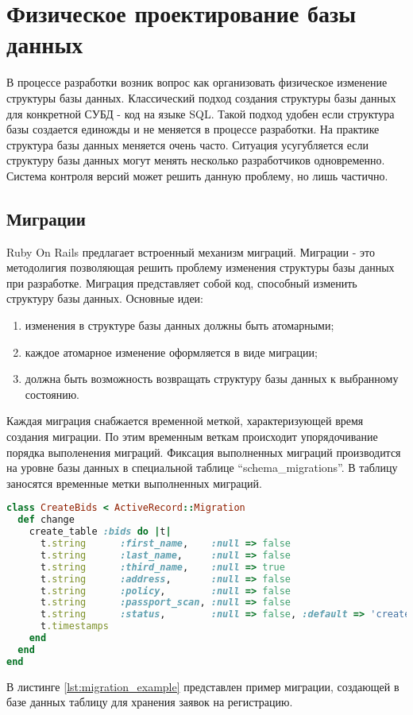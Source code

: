 \section{Физическое проектирование базы данных}
В процессе разработки возник вопрос как организовать физическое изменение
структуры базы данных. Классический подход создания структуры базы данных для
конкретной СУБД - код на языке SQL. Такой подход удобен если структура базы
создается единожды и не меняется в процессе разработки. На практике структура
базы данных меняется очень часто. Ситуация усугубляется если структуру базы
данных могут менять несколько разработчиков одновременно. Система контроля
версий может решить данную проблему, но лишь частично.

\subsection{Миграции}
Ruby On Rails предлагает встроенный механизм миграций. Миграции - это
методолигия позволяющая решить проблему изменения структуры базы данных при
разработке. Миграция представляет собой код, способный изменить структуру базы
данных.
Основные идеи:
\begin{enumerate}
  \item изменения в структуре базы данных должны быть атомарными;
  \item каждое атомарное изменение оформляется в виде миграции;
  \item должна быть возможность возвращать структуру базы данных к выбранному
состоянию.
\end{enumerate}

Каждая миграция снабжается временной меткой, характеризующей время создания
миграции. По этим временным веткам происходит упорядочивание порядка выполенения
миграций. Фиксация выполненных миграций производится на уровне базы данных в
специальной таблице “schema\_migrations”. В таблицу заносятся временные метки
выполненных миграций.

\begin{lstlisting}[language=Ruby,caption=Пример миграций
,label={lst:migration_example}] 
class CreateBids < ActiveRecord::Migration
  def change
    create_table :bids do |t|
      t.string      :first_name,    :null => false
      t.string      :last_name,     :null => false
      t.string      :third_name,    :null => true
      t.string      :address,       :null => false
      t.string      :policy,        :null => false
      t.string      :passport_scan, :null => false
      t.string      :status,        :null => false, :default => 'created'
      t.timestamps
    end
  end
end
\end{lstlisting}

В листинге \ref{lst:migration_example} представлен пример миграции, создающей в
базе данных таблицу для хранения заявок на регистрацию.
